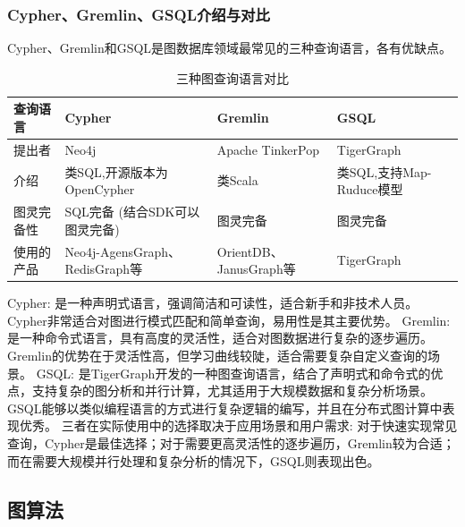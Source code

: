 \subsubsection*{Cypher、Gremlin、GSQL介绍与对比}
Cypher、Gremlin和GSQL是图数据库领域最常见的三种查询语言，各有优缺点。%
\begin{table}[htbp]
	\centering
	\caption{三种图查询语言对比}
	\begin{tabularx}{\textwidth}{|X|X|X|X| }
		\hline
		查询语言  & Cypher                       & Gremlin              & GSQL                \\
		\hline
		提出者   & Neo4j                        & Apache TinkerPop     & TigerGraph          \\
		\hline
		介绍    & 类SQL,开源版本为OpenCypher         & 类Scala               & 类SQL,支持Map-Ruduce模型 \\
		\hline
		图灵完备性 & SQL完备 (结合SDK可以图灵完备)          & 图灵完备                 & 图灵完备                \\
		\hline
		使用的产品 & Neo4j-AgensGraph、RedisGraph等 & OrientDB、JanusGraph等 & TigerGraph          \\
		\hline
	\end{tabularx}%
	\label{tab:addlabel}%
\end{table}%

Cypher: 是一种声明式语言，强调简洁和可读性，适合新手和非技术人员。Cypher非常适合对图进行模式匹配和简单查询，易用性是其主要优势。
Gremlin: 是一种命令式语言，具有高度的灵活性，适合对图数据进行复杂的逐步遍历。Gremlin的优势在于灵活性高，但学习曲线较陡，适合需要复杂自定义查询的场景。
GSQL: 是TigerGraph开发的一种图查询语言，结合了声明式和命令式的优点，支持复杂的图分析和并行计算，尤其适用于大规模数据和复杂分析场景。GSQL能够以类似编程语言的方式进行复杂逻辑的编写，并且在分布式图计算中表现优秀。
三者在实际使用中的选择取决于应用场景和用户需求: 对于快速实现常见查询，Cypher是最佳选择；对于需要更高灵活性的逐步遍历，Gremlin较为合适；而在需要大规模并行处理和复杂分析的情况下，GSQL则表现出色。
\vspace{1cm}
\subsection{图算法}

